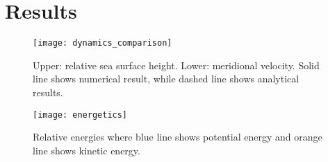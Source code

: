 \section{Results}
\label{sec:results}

\begin{figure}[htbp]
	\centering
	\texttt{[image: dynamics\_comparison]}
	\caption{Upper: relative sea surface height. Lower: meridional velocity. Solid line shows numerical result, while dashed line shows analytical results.}
	\label{fig:dynamics}
\end{figure}

\begin{figure}[htbp]
	\centering
	\texttt{[image: energetics]}
	\caption{Relative energies where blue line shows potential energy and orange line shows kinetic energy.}
	\label{fig:energetics}
\end{figure}